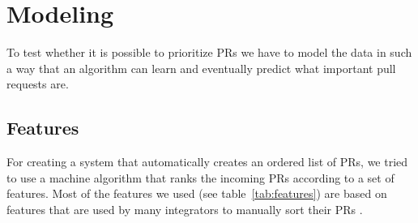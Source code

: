 \section{Modeling}
\label{sec:modeling}

To test whether it is possible to prioritize PRs we have to model the data in such a way that an algorithm can learn and eventually predict what important pull requests are.

\subsection{Features}
\label{sec:features}

For creating a system that automatically creates an ordered list of PRs, we tried to use a machine algorithm that ranks the incoming PRs according to a set of features.
Most of the features we used (see table~\ref{tab:features}) are based on features that are used by many integrators to manually sort their PRs \cite{GZSD15}.

